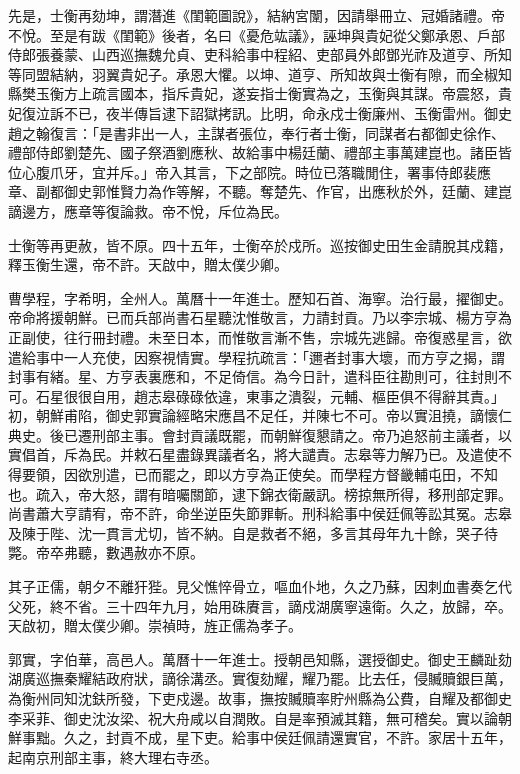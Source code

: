 \begin{pinyinscope}
先是，士衡再劾坤，謂潛進《閨範圖說》，結納宮闈，因請舉冊立、冠婚諸禮。帝不悅。至是有跋《閨範》後者，名曰《憂危竑議》，誣坤與貴妃從父鄭承恩、戶部侍郎張養蒙、山西巡撫魏允貞、吏科給事中程紹、吏部員外郎鄧光祚及道亨、所知等同盟結納，羽翼貴妃子。承恩大懼。以坤、道亨、所知故與士衡有隙，而全椒知縣樊玉衡方上疏言國本，指斥貴妃，遂妄指士衡實為之，玉衡與其謀。帝震怒，貴妃復泣訴不已，夜半傳旨逮下詔獄拷訊。比明，命永戍士衡廉州、玉衡雷州。御史趙之翰復言：「是書非出一人，主謀者張位，奉行者士衡，同謀者右都御史徐作、禮部侍郎劉楚先、國子祭酒劉應秋、故給事中楊廷蘭、禮部主事萬建崑也。諸臣皆位心腹爪牙，宜并斥。」帝入其言，下之部院。時位已落職閒住，署事侍郎裴應章、副都御史郭惟賢力為作等解，不聽。奪楚先、作官，出應秋於外，廷蘭、建崑謫邊方，應章等復論救。帝不悅，斥位為民。

士衡等再更赦，皆不原。四十五年，士衡卒於戍所。巡按御史田生金請脫其戍籍，釋玉衡生還，帝不許。天啟中，贈太僕少卿。

曹學程，字希明，全州人。萬曆十一年進士。歷知石首、海寧。治行最，擢御史。帝命將援朝鮮。已而兵部尚書石星聽沈惟敬言，力請封貢。乃以李宗城、楊方亨為正副使，往行冊封禮。未至日本，而惟敬言漸不售，宗城先逃歸。帝復惑星言，欲遣給事中一人充使，因察視情實。學程抗疏言：「邇者封事大壞，而方亨之揭，謂封事有緒。星、方亨表裏應和，不足倚信。為今日計，遣科臣往勘則可，往封則不可。石星很很自用，趙志皋碌碌依違，東事之潰裂，元輔、樞臣俱不得辭其責。」初，朝鮮甫陷，御史郭實論經略宋應昌不足任，并陳七不可。帝以實沮撓，謫懷仁典史。後已遷刑部主事。會封貢議既罷，而朝鮮復懇請之。帝乃追怒前主議者，以實倡首，斥為民。并敕石星盡錄異議者名，將大譴責。志皋等力解乃已。及遣使不得要領，因欲別遣，已而罷之，即以方亨為正使矣。而學程方督畿輔屯田，不知也。疏入，帝大怒，謂有暗囑關節，逮下錦衣衛嚴訊。榜掠無所得，移刑部定罪。尚書蕭大亨請宥，帝不許，命坐逆臣失節罪斬。刑科給事中侯廷佩等訟其冤。志皋及陳于陛、沈一貫言尤切，皆不納。自是救者不絕，多言其母年九十餘，哭子待斃。帝卒弗聽，數遇赦亦不原。

其子正儒，朝夕不離犴狴。見父憔悴骨立，嘔血仆地，久之乃蘇，因刺血書奏乞代父死，終不省。三十四年九月，始用硃賡言，謫戍湖廣寧遠衛。久之，放歸，卒。天啟初，贈太僕少卿。崇禎時，旌正儒為孝子。

郭實，字伯華，高邑人。萬曆十一年進士。授朝邑知縣，選授御史。御史王麟趾劾湖廣巡撫秦耀結政府狀，謫徐溝丞。實復劾耀，耀乃罷。比去任，侵贓贖銀巨萬，為衡州同知沈鈇所發，下吏戍邊。故事，撫按贓贖率貯州縣為公費，自耀及都御史李采菲、御史沈汝梁、祝大舟咸以自潤敗。自是率預滅其籍，無可稽矣。實以論朝鮮事黜。久之，封貢不成，星下吏。給事中侯廷佩請還實官，不許。家居十五年，起南京刑部主事，終大理右寺丞。


\end{pinyinscope}
